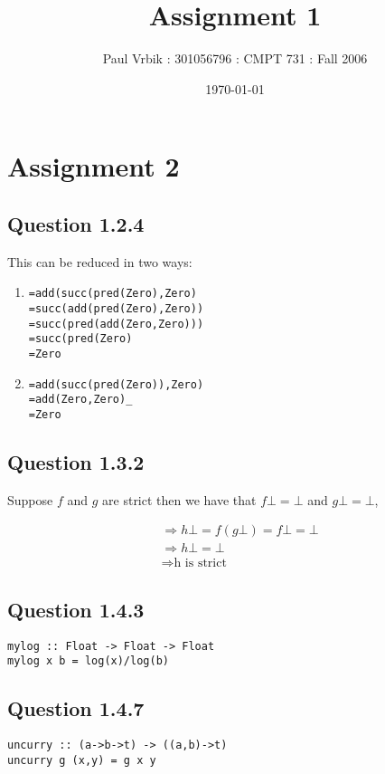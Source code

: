 \documentclass[10pt]{report}
\title{Assignment 1}
\author{Paul Vrbik : 301056796 : CMPT 731 : Fall 2006}
\date{\today}
\begin{document}
\maketitle

\section*{Assignment 2}

\subsection*{Question 1.2.4}

This can be reduced in two ways:

\begin{enumerate}
\item 
\begin{verbatim}
=add(succ(pred(Zero),Zero)
=succ(add(pred(Zero),Zero))
=succ(pred(add(Zero,Zero)))
=succ(pred(Zero)
=Zero
\end{verbatim}

\item
\begin{verbatim}
=add(succ(pred(Zero)),Zero)
=add(Zero,Zero)_
=Zero
\end{verbatim}
\end{enumerate}

\subsection*{Question 1.3.2}

Suppose $f$ and $g$ are strict then we have that $f \bot =\bot$ and $g \bot =\bot$, 

\begin{align*}
{}& \Rightarrow h \bot = f (g \bot)=f \bot= \bot \\
{}& \Rightarrow h \bot = \bot \\
{}& \Rightarrow \text{h is strict}
\end{align*}

\subsection*{Question 1.4.3}

\begin{verbatim}
mylog :: Float -> Float -> Float
mylog x b = log(x)/log(b)
\end{verbatim}

\subsection*{Question 1.4.7}
\begin{verbatim}
uncurry :: (a->b->t) -> ((a,b)->t)
uncurry g (x,y) = g x y
\end{verbatim}
\end{document}
